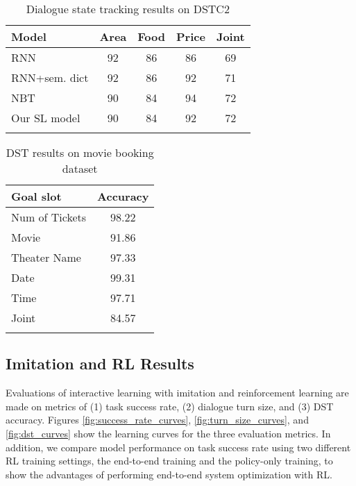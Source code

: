 \documentclass[11pt,a4paper]{article}
\begin{document}
    \begin{table}[th]
      \caption{Dialogue state tracking results on DSTC2}
      \label{tab:table_dstc2_sl}
      \centering
      \begin{tabular}{l c c c c}
        \hline  
        \textbf{Model} & \textbf{Area}  & \textbf{Food}  & \textbf{Price}  & \textbf{Joint} \\
        \hline
        RNN & 92 & 86 & 86 & 69  \\
        RNN+sem. dict & 92 & 86 & 92 & 71  \\
        NBT & 90 & 84 & 94 & 72  \\
        Our SL model & 90 & 84 & 92 & 72  \\
        \hline
        \vspace*{-4ex}
      \end{tabular}     
    \end{table}


    \begin{table}[th]
      \caption{DST results on movie booking dataset}
      \label{tab:table_movie_corpus_sl}
      \centering
      \begin{tabular}{l c}
        \hline  
        \textbf{Goal slot} 		& \textbf{Accuracy} \\
        \hline  
        Num of Tickets		& 98.22 \\
        Movie 				& 91.86 \\
        Theater Name 		& 97.33 \\
        Date 				& 99.31 \\
        Time 				& 97.71 \\
        \hline
        Joint 				& 84.57 \\
        \hline
        \vspace*{-4ex}
      \end{tabular}     
    \end{table}
    
\subsection{Imitation and RL Results}
\label{sec:rl_results}
    Evaluations of interactive learning with imitation and reinforcement learning are made on metrics of (1) task success rate, (2) dialogue turn size, and (3) DST accuracy. Figures \ref{fig:success_rate_curves}, \ref{fig:turn_size_curves}, and \ref{fig:dst_curves} show the learning curves for the three evaluation metrics. In addition, we compare model performance on task success rate using two different RL training settings, the end-to-end training and the policy-only training, to show the advantages of performing end-to-end system optimization with RL.
\end{document}
